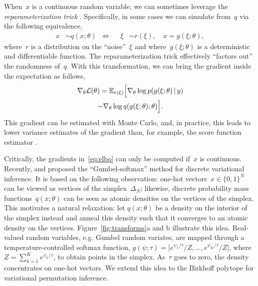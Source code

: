 \documentclass[twoside]{article}
\begin{document}
When~$x$ is a continuous random variable, we can sometimes leverage the \emph{reparameterization trick}
\citep{Salimans2013, Kingma2014}.  Specifically, in some cases we can
simulate from~$q$ via the following equivalence,
\begin{align*}
  x &\sim q(x; \theta)
      & \iff & &  
  \xi &\sim r(\xi), \quad x = g(\xi;\theta),
\end{align*}
where~$r$ is a distribution on the ``noise''~$\xi$ and
where~$g(\xi; \theta)$ is a deterministic and differentiable
function.
The reparameterization trick effectively ``factors out'' the randomness
of~$q$. With this transformation, we can bring the gradient inside the
expectation as follows,
\begin{multline}
  \label{eq:elbo}
  \nabla_\theta \mathcal{L}(\theta) 
  = \mathbb{E}_{r(\xi)} \Big[ \nabla_\theta \log p(g(\xi; \theta) \, | \, y) \\
    - \nabla_\theta  \log q(g(\xi; \theta); \theta) \Big].
\end{multline}
This gradient can be estimated with Monte Carlo, and, in practice,
this leads to lower variance estimates of the gradient than, for
example, the score function estimator \citep{Williams1992, Glynn1990}.

Critically, the gradients in~\eqref{eq:elbo} can only be computed
if~$x$ is continuous. Recently, \citep{maddison2016concrete} and
\citep{jang2016categorical} proposed the ``Gumbel-softmax'' method for
discrete variational inference. It is based on the following
observation: one-hot vectors~${x \in \{0,1\}^N}$ can be
viewed as vertices of the simplex~$\Delta_N$; likewise, discrete
probability mass functions~$q(x; \theta)$ can be seen as atomic
densities on the vertices of the simplex.  This motivates a natural
relaxation: let $q(x; \theta)$ be a density on the interior of the
simplex instead and anneal this density such that it converges to an
atomic density on the vertices. Figure~\ref{fig:transforms}a and b
illustrate this idea. Real-valued random variables, e.g. Gumbel random
variates, are mapped through a temperature-controlled softmax
function,
${g(\psi; \tau) = \big[e^{\psi_1 / \tau}/Z, \ldots, e^{\psi_K /
    \tau}/Z \big]}$, where~$Z=\sum_{k=1}^K e^{\psi_k / \tau}$, to
obtain points in the simplex. As~$\tau$ goes to zero, the density
concentrates on one-hot vectors.  We extend this idea to the Birkhoff
polytope for variational permutation inference.
\end{document}
